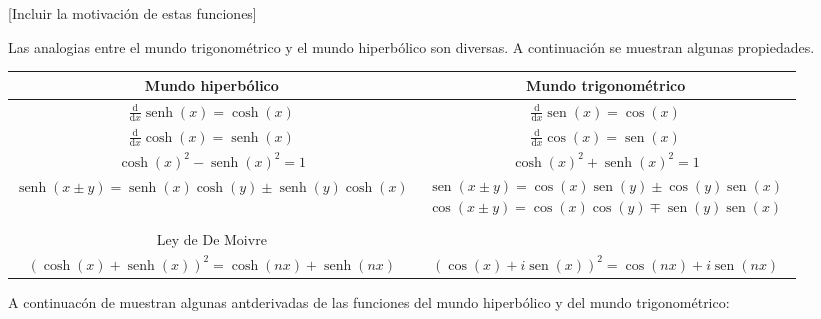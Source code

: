 \documentclass{article}
\numberwithin{equation}{section}
\DeclareMathOperator{\sen}{sen}
\DeclareMathOperator{\senh}{senh}
\newcommand{\der}[1]{\frac{\mathrm{d}}{\mathrm{d}#1}}
\begin{document}
[Incluir la motivación de estas funciones]

Las analogias entre el mundo trigonométrico y el mundo hiperbólico son diversas. A continuación se muestran algunas propiedades.

\hspace{1cm}

\begin{center}
{\tabulinesep=1.2mm
\begin{tabu} {|c|c|}
    \hline
    \textbf{Mundo hiperbólico} &  \textbf{Mundo trigonométrico} \\ 
    \hline
    $\der{x}\senh(x)=\cosh(x)$ & $\der{x}\sen(x)=\cos(x)$ \\
    \hline
    $\der{x}\cosh(x)=\senh(x)$ & $\der{x}\cos(x)=\sen(x)$ \\ [0.5ex]
    \hline
    $\cosh(x)^2-\senh(x)^2=1$ & $\cosh(x)^2+\senh(x)^2=1$ \\
    \hline
$\senh(x\pm y)=\senh(x)\cosh(y)\pm \senh(y)\cosh(x)$ & $\begin{array}{c}
    \sen(x\pm y)=\cos(x)\sen(y)\pm \cos(y)\sen(x) \\ 
    \cos(x\pm y)=\cos(x)\cos(y)\mp \sen(y)\sen(x) \\
\end{array}$ \\
    \hline
    Ley de De Moivre & \\
    $\left(\cosh(x)+\senh(x)\right)^2=\cosh(nx)+\senh(nx)$ & $\left(\cos(x)+i\sen(x)\right)^2=\cos(nx)+i\sen(nx)$ \\
    \hline
\end{tabu}}
\end{center}


\hspace{1cm}

A continuacón de muestran algunas antderivadas de las funciones del mundo hiperbólico y del mundo trigonométrico:

\hspace{1cm}
\end{document}
